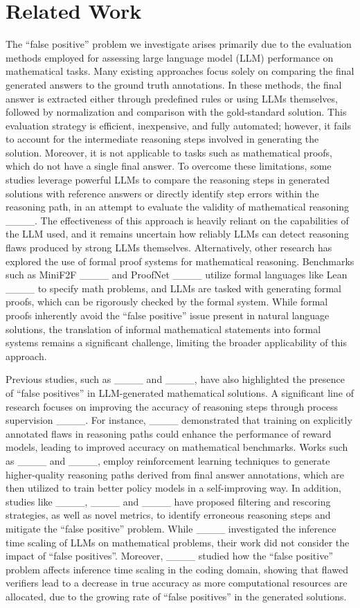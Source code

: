 \section{Related Work}
The ``false positive'' problem we investigate arises primarily due to the evaluation methods employed for assessing large language model (LLM) performance on mathematical tasks. Many existing approaches focus solely on comparing the final generated answers to the ground truth annotations. In these methods, the final answer is extracted either through predefined rules or using LLMs themselves, followed by normalization and comparison with the gold-standard solution. This evaluation strategy is efficient, inexpensive, and fully automated; however, it fails to account for the intermediate reasoning steps involved in generating the solution. Moreover, it is not applicable to tasks such as mathematical proofs, which do not have a single final answer. To overcome these limitations, some studies leverage powerful LLMs to compare the reasoning steps in generated solutions with reference answers or directly identify step errors within the reasoning path, in an attempt to evaluate the validity of mathematical reasoning ____. The effectiveness of this approach is heavily reliant on the capabilities of the LLM used, and it remains uncertain how reliably LLMs can detect reasoning flaws produced by strong LLMs themselves. Alternatively, other research has explored the use of formal proof systems for mathematical reasoning. Benchmarks such as MiniF2F ____ and ProofNet ____ utilize formal languages like Lean ____ to specify math problems, and LLMs are tasked with generating formal proofs, which can be rigorously checked by the formal system. While formal proofs inherently avoid the ``false positive'' issue present in natural language solutions, the translation of informal mathematical statements into formal systems remains a significant challenge, limiting the broader applicability of this approach.

Previous studies, such as ____ and ____, have also highlighted the presence of ``false positives'' in LLM-generated mathematical solutions. A significant line of research focuses on improving the accuracy of reasoning steps through process supervision ____. For instance, ____ demonstrated that training on explicitly annotated flaws in reasoning paths could enhance the performance of reward models, leading to improved accuracy on mathematical benchmarks. Works such as ____ and ____, employ reinforcement learning techniques to generate higher-quality reasoning paths derived from final answer annotations, which are then utilized to train better policy models in a self-improving way. In addition, studies like ____, ____ and ____ have proposed filtering and rescoring strategies, as well as novel metrics, to identify erroneous reasoning steps and mitigate the ``false positive'' problem. While ____ investigated the inference time scaling of LLMs on mathematical problems, their work did not consider the impact of ``false positives''. Moreover, ____ studied how the ``false positive'' problem affects inference time scaling in the coding domain, showing that flawed verifiers lead to a decrease in true accuracy as more computational resources are allocated, due to the growing rate of ``false positives'' in the generated solutions.